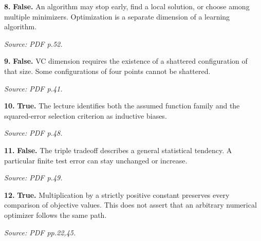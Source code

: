\documentclass[11pt,a4paper]{article}
\begin{document}
\par\noindent\begin{minipage}{\linewidth}
\textbf{8.} \textbf{False.} An algorithm may stop early, find a local solution, or choose among multiple minimizers. Optimization is a separate dimension of a learning algorithm.

{\footnotesize\textit{Source: PDF p.52.}}
\end{minipage}\par\vspace{3mm}
\par\noindent\begin{minipage}{\linewidth}
\textbf{9.} \textbf{False.} VC dimension requires the existence of a shattered configuration of that size. Some configurations of four points cannot be shattered.

{\footnotesize\textit{Source: PDF p.41.}}
\end{minipage}\par\vspace{3mm}
\par\noindent\begin{minipage}{\linewidth}
\textbf{10.} \textbf{True.} The lecture identifies both the assumed function family and the squared-error selection criterion as inductive biases.

{\footnotesize\textit{Source: PDF p.48.}}
\end{minipage}\par\vspace{3mm}
\par\noindent\begin{minipage}{\linewidth}
\textbf{11.} \textbf{False.} The triple tradeoff describes a general statistical tendency. A particular finite test error can stay unchanged or increase.

{\footnotesize\textit{Source: PDF p.49.}}
\end{minipage}\par\vspace{3mm}
\par\noindent\begin{minipage}{\linewidth}
\textbf{12.} \textbf{True.} Multiplication by a strictly positive constant preserves every comparison of objective values. This does not assert that an arbitrary numerical optimizer follows the same path.

{\footnotesize\textit{Source: PDF pp.22,45.}}
\end{minipage}\par\vspace{3mm}
\end{document}
